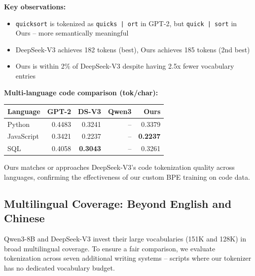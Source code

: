 \textbf{Key observations:}
\begin{itemize}
    \item \texttt{quicksort} is tokenized as \texttt{quicks | ort} in GPT-2, but \texttt{quick | sort} in Ours -- more semantically meaningful
    \item DeepSeek-V3 achieves 182 tokens (best), Ours achieves 185 tokens (2nd best)
    \item Ours is within 2\% of DeepSeek-V3 despite having 2.5x fewer vocabulary entries
\end{itemize}

\textbf{Multi-language code comparison (tok/char):}

\begin{table}[h]
    \centering
    \begin{tabular}{lrrrr}
        \toprule
        \textbf{Language} & \textbf{GPT-2} & \textbf{DS-V3} & \textbf{Qwen3} & \textbf{Ours} \\
        \midrule
        Python & 0.4483 & 0.3241 & -- & 0.3379 \\
        JavaScript & 0.3421 & 0.2237 & -- & \textbf{0.2237} \\
        SQL & 0.4058 & \textbf{0.3043} & -- & 0.3261 \\
        \bottomrule
    \end{tabular}
\end{table}

Ours matches or approaches DeepSeek-V3's code tokenization quality across languages, confirming the effectiveness of our custom BPE training on code data.

\subsection{Multilingual Coverage: Beyond English and Chinese}

Qwen3-8B and DeepSeek-V3 invest their large vocabularies (151K and 128K) in broad multilingual coverage. To ensure a fair comparison, we evaluate tokenization across seven additional writing systems -- scripts where our tokenizer has no dedicated vocabulary budget.

